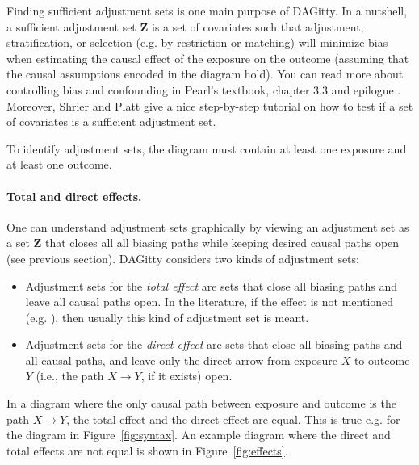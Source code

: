 \documentclass[a4paper]{article} %
\newcommand{\pp}{DAGitty\xspace}
\begin{document}
\label{sec:adjustment}

Finding sufficient adjustment sets is one main purpose 
of \pp. In a nutshell, a sufficient adjustment
set $\mathbf{Z}$ is a set of covariates such that adjustment,
stratification, or selection (e.g. by restriction or 
matching) will minimize bias when estimating the causal 
effect of the exposure on the outcome (assuming that
the causal assumptions encoded in the diagram hold). 
You can read more about controlling bias and confounding in Pearl's textbook, 
chapter 3.3 and epilogue \cite{Pearl2009}. 
Moreover, Shrier and Platt \cite{ShrierP2008} 
give a nice step-by-step tutorial on how to test if a set of covariates
is a sufficient adjustment set.

To identify adjustment sets, the diagram must contain at least
one exposure and at least one outcome.

\paragraph{Total and direct effects.}
One can understand adjustment sets graphically by viewing an adjustment set
as a set $\mathbf{Z}$ that closes all all biasing 
paths while keeping desired causal paths open
(see previous section).
\pp considers two kinds of adjustment sets: 

\begin{itemize}
 \item Adjustment sets for the \emph{total effect} are sets that 
close all biasing paths and leave all causal paths
open. 
 In the literature, if the effect is not mentioned
(e.g. \cite{ShrierP2008,KnueppelS2010}), then usually
this kind of adjustment set is meant.
 \item   Adjustment sets for the \emph{direct effect} are sets that 
close all biasing paths and all causal paths, and leave only 
the direct arrow from exposure $X$ to outcome $Y$ (i.e., the path
$X \rightarrow Y$, if it exists) open.
\end{itemize}

In a diagram where the only causal path between exposure 
and outcome is the path $X \rightarrow Y$, the total effect
and the direct effect are equal. This is true e.g. for the 
diagram in Figure~\ref{fig:syntax}. An example diagram where the 
direct and total effects are not equal is shown in 
Figure~\ref{fig:effects}.
\end{document}
